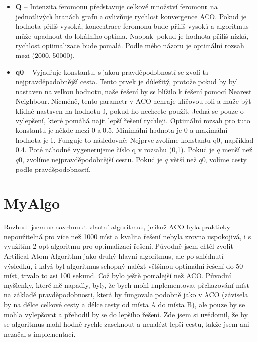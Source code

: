 \begin{itemize}
    \item \textbf{Q} -- Intenzita feromonu představuje celkové množství feromonu na jednotlivých hranách grafu a ovlivňuje rychlost konvergence ACO. Pokud je hodnota příliš vysoká, koncentrace feromonu bude příliš vysoká a algoritmus může upadnout do lokálního optima. Naopak, pokud je hodnota příliš nízká, rychlost optimalizace bude pomalá. Podle mého názoru je optimální rozsah mezi (2000, 50000).
    \item \textbf{q0} -- Vyjadřuje konstantu, s jakou pravděpodobností se zvolí ta nejpravděpodobnější cesta. Tento prvek je důležitý, protože pokud by byl nastaven na velkou hodnotu, naše řešení by se blížilo k řešení pomocí Nearest Neighbour. Nicméně, tento parametr v ACO nehraje klíčovou roli a může být klidně nastaven na hodnotu 0, pokud ho nechcete použít. Jedná se pouze o vylepšení, které pomáhá najít lepší řešení rychleji. Optimální rozsah pro tuto konstantu je někde mezi 0 a 0.5. Minimální hodnota je 0 a maximální hodnota je 1. Funguje to následovně: Nejprve zvolíme konstantu q0, například 0.4. Poté náhodně vygenerujeme číslo q v rozsahu (0,1). Pokud je $q$ menší než $q0$, zvolíme nejpravděpodobnější cestu. Pokud je $q$ větší než $q0$, volíme cesty podle pravděpodobností.
\end{itemize}





\section{MyAlgo} 
Rozhodl jsem se navrhnout vlastní algoritmus, jelikož ACO byla prakticky nepoužitelná pro více než 1000 míst a kvalita řešení nebyla zrovna uspokojivá, i s využitím 2-opt algoritmu pro optimalizaci řešení. Původně jsem chtěl zvolit Artifical Atom Algorithm jako druhý hlavní algoritmus, ale po shlédnutí výsledků, i když byl algoritmus schopný nalézt většinou optimální řešení do 50 míst, trvalo to asi 100 sekund. Což bylo ještě pomalejší než ACO. Původní myšlenky, které mě napadly, byly, že bych mohl implementovat přehazování míst na základě pravděpodobnosti, která by fungovala podobně jako v ACO (závisela by na délce celkové cesty a délce cesty od místa A do místa B), ale pouze by se mohla vylepšovat a přehodil by se do lepšího řešení. Zde jsem si uvědomil, že by se algoritmus mohl hodně rychle zaseknout a nenalézt lepší cestu, takže jsem ani nezačal s implementací.

